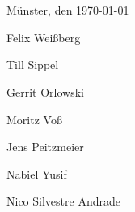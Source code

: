 \section*{}
Münster, den \today


\vspace{2cm}

\begin{multicols}{2}

\begin{center}

Felix Weißberg

\vspace{1.5cm}

Till Sippel

\vspace{1.5cm}

Gerrit Orlowski

\vspace{0.85cm}

Moritz Voß

\vspace{0.85cm}

Jens Peitzmeier

\vspace{0.85cm}

Nabiel Yusif

\vspace{0.85cm}

Nico Silvestre Andrade
\end{center}
\end{multicols}
    


